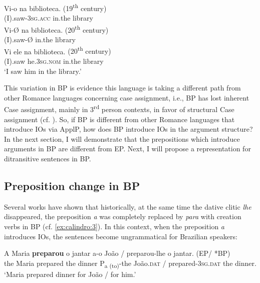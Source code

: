 \documentclass[output=paper,colorlinks,citecolor=brown,modfonts,nonflat]{langsci/langscibook}
\begin{document}
\ea%
    \label{ex:calindro:10}
    \ea\label{ex:calindro:10a}
    \gll Vi-{o}    na     biblioteca.  \hspace*{8em} {(19\textsuperscript{th} century)}\\
    (I).saw-\textsc{3sg.acc}     in.the     library\\
    \ex\label{ex:calindro:10b}
    \gll Vi-{Ø}    na   biblioteca.   \hspace*{10.5em}   {(20\textsuperscript{th} century)}\\
    (I).saw-Ø  in.the  library\\
    \ex\label{ex:calindro:10c}
    \gll Vi        {ele}                     na        biblioteca.  \hspace*{7em}  {(20\textsuperscript{th} century)}\\
    (I).saw    he.\textsc{3sg.nom}  in.the  library\\
    \glt ‘I saw him in the library.’\hfill \citep[94]{CarvalhoCalindro2018}
    \z
\z

This variation in BP is evidence this language is taking a different path from other Romance languages concerning case assignment, i.e., BP has lost inherent Case assignment, mainly in 3\textsuperscript{rd} person contexts, in favor of structural Case assignment (cf. \citealt{Calindro2015, CarvalhoCalindro2018}). So, if BP is different from other Romance languages that introduce IOs via ApplP, how does BP introduce IOs in the argument structure? In the next section, I will demonstrate that the prepositions which introduce arguments in BP are different from EP. Next, I will propose a representation for ditransitive sentences in BP.

\subsection{Preposition change in BP}\label{sec:calindro:2.2}%

Several works have shown that historically, at the same time the dative clitic \textit{lhe} disappeared, the preposition \textit{a} was completely replaced by \textit{para} with creation verbs in BP (cf. \ref{ex:calindro:3}). In this context, when the preposition \textit{a} introduces IOs, the sentences become ungrammatical for Brazilian speakers:

\ea%
    \label{ex:calindro:11}
    \gll A   Maria \textbf{preparou} o jantar     a-o {João} / preparou-lhe o jantar. \hspace{7cm} (EP/ *BP) \\
    the Maria prepared  the dinner  P{\textsubscript{a (to)}}-the João.\textsc{dat} / prepared-\textsc{3sg.dat} the dinner. { }\\
    \glt `Maria prepared dinner for João / for him.'
    \z
\end{document}
